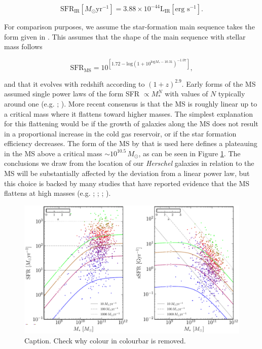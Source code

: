 \begin{equation}
	\textrm{SFR}_{\textrm{IR}} [M_\odot\textrm{yr}^{-1}] = 3.88\times10^{-44}\textrm{L}_{\textrm{IR}} [\textrm{erg s}^{-1}].
	\label{eq:LIR_SFR_calibration}
\end{equation}

For comparison purposes, we assume the star-formation main sequence takes the form given in \citealt{Scoville_2017}. This assumes that the shape of the main sequence with stellar mass follows 

\begin{equation}
	\textrm{SFR}_{\textrm{MS}} = 10^{[1.72-\textrm{log}(1+10^{\textrm{log}M_*-10.31})^{-1.07}]},
	\label{eq:scoville_ms}
\end{equation}

\noindent and that it evolves with redshift according to $(1+z)^{2.9}$. Early forms of the MS assumed single power laws of the form SFR $\propto M_*^N$ with values of $N$ typically around one (e.g. \citealt{Daddi_2007}; \citealt{Elbaz_2007}). More recent consensus is that the MS is roughly linear up to a critical mass where it flattens toward higher masses. The simplest explanation for this flattening would be if the growth of galaxies along the MS does not result in a proportional increase in the cold gas reservoir, or if the star formation efficiency decreases. The form of the MS by \citealt{Scoville_2017} that is used here defines a plateauing in the MS above a critical mass $\sim 10^{10.5}\,M_\odot$, as can be seen in Figure \ref{fig:star_formation_ms}. The conclusions we draw from the location of our \textit{Herschel} galaxies in relation to the MS will be substantially affected by the deviation from a linear power law, but this choice is backed by many studies that have reported evidence that the MS flattens at high masses (e.g. \citealt{Magnelli_2014}; \citealt{Whitaker_2014}; \citealt{Schreiber_2015}; \citealt{Tomczak_2016}).

\begin{figure}
	\centering
	\includegraphics[width=0.9\columnwidth]{Figures/star_formation_ms.pdf}
	\caption{{\color{red} Caption. Check why colour in colourbar is removed.}}
	\label{fig:star_formation_ms}
\end{figure}

